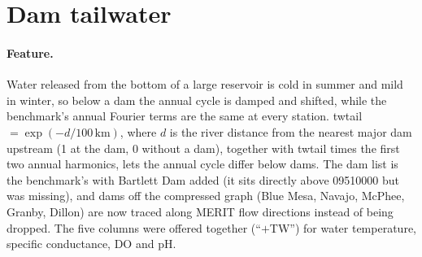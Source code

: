 \documentclass[11pt]{article}
\newcommand{\codeus}{\textunderscore\allowbreak}
\newcommand{\code}[1]{{\ttfamily\let\_\codeus #1}}
\begin{document}
\section{Dam tailwater}\label{sec:tailwater}

\paragraph{Feature.} Water released from the bottom of a large reservoir is cold in summer and
mild in winter, so below a dam the annual cycle is damped and shifted, while the benchmark's
annual Fourier terms are the same at every station. \code{tw\_tail} $=\exp(-d/100\,\text{km})$,
where $d$ is the river distance from the nearest major dam upstream (1 at the dam, $0$ without a
dam), together with \code{tw\_tail} times the first two annual harmonics, lets the annual cycle
differ below dams. The dam list is the benchmark's with Bartlett Dam added (it sits directly
above 09510000 but was missing), and dams off the compressed graph (Blue Mesa, Navajo, McPhee,
Granby, Dillon) are now traced along MERIT flow directions instead of being dropped. The five
columns were offered together (``$+$TW'') for water temperature, specific conductance, DO and pH.
\end{document}
